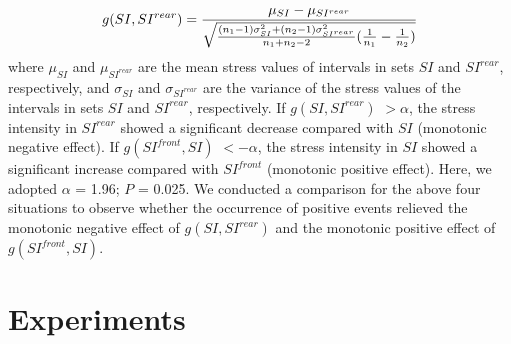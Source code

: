 \documentclass[5p,times,numbers,authoryear]{elsarticle}
\begin{document}
\begin{equation}
\small{g(SI,SI^{rear})}= \frac{\mu_{SI}-\mu_{SI^{rear}}}{\sqrt{\frac{(n_1-1)\sigma^2_{SI}+(n_2-1)\sigma^2_{SI^{rear}}}{n_1+n_2-2}(\frac{1}{n_1}-\frac{1}{n_2})}}
\end{equation}
where $\mu_{SI}$ and $\mu_{SI^{rear}}$ are the mean stress values of intervals in sets $SI$ and $SI^{rear}$, respectively,
and $\sigma_{SI}$ and $\sigma_{SI^{rear}}$ are the variance of the stress values of the intervals in sets $SI$ and $SI^{rear}$, respectively.
If $g(SI,SI^{rear})$ $> \alpha$, the stress intensity in $SI^{rear}$ showed a significant decrease compared with $SI$ (monotonic negative effect).
If $g(SI^{front},SI)$ $< -\alpha$, the stress intensity in $SI$ showed a significant increase compared with $SI^{front}$ (monotonic positive effect).
Here, we adopted $\alpha$ = 1.96; $P$ = 0.025.
We conducted a comparison for the above four situations to observe whether the occurrence of positive events relieved the monotonic negative effect of $g(SI,SI^{rear})$
and the monotonic positive effect of $g(SI^{front},SI)$.

\section{Experiments}
\end{document}
